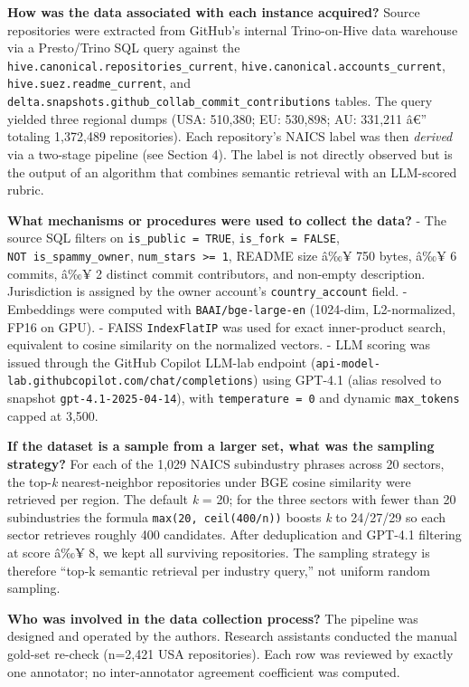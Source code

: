 \textbf{How was the data associated with each instance acquired?}
Source repositories were extracted from GitHub's internal Trino-on-Hive
data warehouse via a Presto/Trino SQL query against the
\texttt{hive.canonical.repositories\_current}, \texttt{hive.canonical.accounts\_current},
\texttt{hive.suez.readme\_current}, and
\texttt{delta.snapshots.github\_collab\_commit\_contributions} tables. The
query yielded three regional dumps (USA: 510,380; EU: 530,898;
AU: 331,211 â€'' totaling 1,372,489 repositories). Each repository's
NAICS label was then \emph{derived} via a two-stage pipeline (see
Section 4). The label is not directly observed but is the output of
an algorithm that combines semantic retrieval with an LLM-scored
rubric.

\textbf{What mechanisms or procedures were used to collect the data?}
- The source SQL filters on \texttt{is\_public\ =\ TRUE}, \texttt{is\_fork\ =\ FALSE},
\texttt{NOT\ is\_spammy\_owner}, \texttt{num\_stars\ \textgreater{}=\ 1}, README size â‰¥ 750 bytes,
â‰¥ 6 commits, â‰¥ 2 distinct commit contributors, and non-empty
description. Jurisdiction is assigned by the owner account's
\texttt{country\_account} field.
- Embeddings were computed with \texttt{BAAI/bge-large-en} (1024-dim,
L2-normalized, FP16 on GPU).
- FAISS \texttt{IndexFlatIP} was used for exact inner-product search,
equivalent to cosine similarity on the normalized vectors.
- LLM scoring was issued through the GitHub Copilot LLM-lab endpoint
(\texttt{api-model-lab.githubcopilot.com/chat/completions}) using GPT-4.1
(alias resolved to snapshot \texttt{gpt-4.1-2025-04-14}), with
\texttt{temperature\ =\ 0} and dynamic \texttt{max\_tokens} capped at 3,500.

\textbf{If the dataset is a sample from a larger set, what was the sampling
strategy?}
For each of the 1,029 NAICS subindustry phrases across 20 sectors,
the top-\emph{k} nearest-neighbor repositories under BGE cosine similarity
were retrieved per region. The default \emph{k} = 20; for the three
sectors with fewer than 20 subindustries the formula
\texttt{max(20,\ ceil(400/n))} boosts \emph{k} to 24/27/29 so each sector retrieves
roughly 400 candidates. After deduplication and GPT-4.1 filtering at
score â‰¥ 8, we kept all surviving repositories. The sampling strategy
is therefore ``top-k semantic retrieval per industry query,'' not
uniform random sampling.

\textbf{Who was involved in the data collection process?}
The pipeline was designed and operated by the authors. Research
assistants conducted the manual gold-set re-check (n=2,421 USA
repositories). Each row was reviewed by exactly one annotator; no
inter-annotator agreement coefficient was computed.

